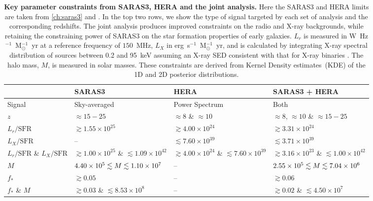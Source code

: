 \def\arraystretch{1.5}
\begin{table}[]
    \centering
    \begin{tabular}{|p{2cm}|p{3.5cm}|p{3.5cm}|p{3.5cm}|}
         \hline
         & SARAS3 & HERA  & SARAS3 + HERA \\
         \hline
         \hline
         Signal & Sky-averaged & Power Spectrum & Both \\
         \hline
         $z$ & $\approx 15 - 25$ & $\approx 8$ \& $\approx 10$ & $\approx 8$, $\approx 10$ \& \newline $\approx 15 - 25$ \\
         \hline
         \hline
         $L_{r}/\mathrm{SFR}$ & $\gtrsim 1.55\times10^{25}$ & $\gtrsim4.00\times10^{24}$ & $\gtrsim3.31\times10^{24}$ \\
         \hline
         $L_{X}/\mathrm{SFR}$ & -- & $\lesssim7.60\times10^{39}$ & $\lesssim3.71\times10^{39}$ \\
         \hline
         $L_{r}/\mathrm{SFR}$ \& $L_{X}/\mathrm{SFR}$ & $\gtrsim 1.00\times10^{25}$ \& \newline $\lesssim 1.09\times10^{42}$ & $\gtrsim 4.00\times10^{24}$ \& \newline $\lesssim 7.60\times10^{39}$ & $\gtrsim 3.16\times10^{23}$ \& \newline $\lesssim 1.00\times10^{42}$ \\
         \hline
         $M$ & $4.40\times10^{5} \lesssim M \newline \lesssim 1.10\times10^{7}$ & -- & $2.55\times10^{5} \lesssim M \newline \lesssim 7.04\times10^{6}$\\
         \hline
         $f_*$ & $\gtrsim 0.05$ & -- & $\gtrsim 0.06$\\
         \hline
         $f_*$ \& $M$ & $\gtrsim 0.03$ \& \newline $\lesssim 8.53\times10^{8}$ & -- & $\gtrsim 0.02$ \& \newline $\lesssim 4.50\times10^{7}$\\
         \hline
    \end{tabular}
    \caption{\textbf{Key parameter constraints from SARAS3, HERA and the joint analysis.} Here the SARAS3 and HERA limits are taken from \cref{ch:saras3} and \cite{HERA_2022b}. In the top two rows, we show the type of signal targeted by each set of analysis and the corresponding redshifts. The joint analysis produces improved constraints on the radio and X-ray backgrounds, while retaining the constraining power of SARAS3 on the star formation properties of early galaxies. $L_r$ is measured in W~Hz$^{-1}$~M$_\odot^{-1}$~yr at a reference frequency of $150$~MHz, $L_X$ in erg~s$^{-1}$~M$_\odot^{-1}$~yr, and is calculated by integrating X-ray spectral distribution of sources between 0.2 and 95~keV  assuming an X-ray SED consistent with that for X-ray binaries \cite{Fragos_Xrays_2013}. The halo mass, $M$, is measured in solar masses. These constraints are derived from Kernel Density estimates~(KDE) of the 1D and 2D posterior distributions.}
    \label{tab:numbers_joint}
\end{table}


